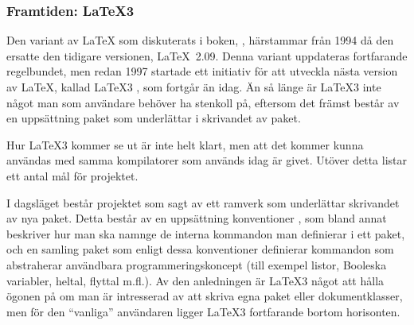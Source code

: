 \documentclass[lang=sv,ptsize=10pt,font=none,nomath,titles=bf,../../a4.tex]{subfiles}
\begin{document}
\subsubsection{Framtiden: \LaTeX3}
Den variant av \LaTeX{} som diskuterats i boken, \LaTeXe{}, härstammar
från 1994 då den ersatte den tidigare versionen, \LaTeX~2.09. Denna
variant uppdateras fortfarande regelbundet, men redan 1997 startade ett
initiativ för att utveckla nästa version av \LaTeX, kallad \LaTeX3
\parencite{Rowley99}, som fortgår än idag. Än så länge är \LaTeX3 inte
något man som användare behöver ha stenkoll på, eftersom det främst
består av en uppsättning paket som underlättar i skrivandet av paket.

Hur \LaTeX3 kommer se ut är inte helt klart, men att det kommer kunna
användas med samma kompilatorer som används idag är givet. Utöver detta
listar \textcite[4\psq]{Rowley99} ett antal mål för projektet.

I dagsläget består projektet som sagt av ett ramverk som underlättar
skrivandet av nya paket. Detta består av en uppsättning konventioner
\parencite{expl3}, som bland annat beskriver hur man ska namnge de
interna kommandon man definierar i ett paket, och en samling paket
\parencite{interface3} som enligt dessa konventioner definierar
kommandon som abstraherar användbara programmeringskoncept (till
exempel listor, Booleska variabler, heltal, flyttal m.fl.).
Av den anledningen är \LaTeX3 något att hålla ögonen på om man är
intresserad av att skriva egna paket eller dokumentklasser, men för
den \enquote{vanliga} användaren ligger \LaTeX3 fortfarande bortom
horisonten.
\end{document}
